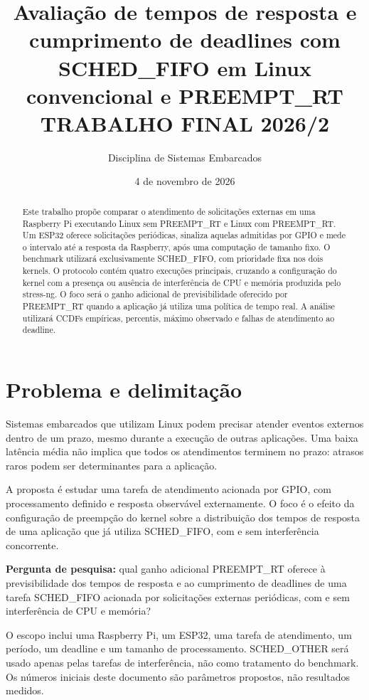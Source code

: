 \documentclass[11pt,a4paper]{article}
\title{Avaliação de tempos de resposta e cumprimento de deadlines com SCHED\_FIFO em Linux convencional e PREEMPT\_RT\\[0.4em]\large TRABALHO FINAL 2026/2}
\author{Disciplina de Sistemas Embarcados}
\date{4 de novembro de 2026}
\begin{document}
\maketitle

\begin{abstract}
Este trabalho propõe comparar o atendimento de solicitações externas em uma Raspberry Pi executando Linux sem PREEMPT\_RT e Linux com PREEMPT\_RT. Um ESP32 oferece solicitações periódicas, sinaliza aquelas admitidas por GPIO e mede o intervalo até a resposta da Raspberry, após uma computação de tamanho fixo. O benchmark utilizará exclusivamente SCHED\_FIFO, com prioridade fixa nos dois kernels. O protocolo contém quatro execuções principais, cruzando a configuração do kernel com a presença ou ausência de interferência de CPU e memória produzida pelo stress-ng. O foco será o ganho adicional de previsibilidade oferecido por PREEMPT\_RT quando a aplicação já utiliza uma política de tempo real. A análise utilizará CCDFs empíricas, percentis, máximo observado e falhas de atendimento ao deadline. %
\end{abstract}


\section{Problema e delimitação}

Sistemas embarcados que utilizam Linux podem precisar atender eventos externos dentro de um prazo, mesmo durante a execução de outras aplicações. Uma baixa latência média não implica que todos os atendimentos terminem no prazo: atrasos raros podem ser determinantes para a aplicação.

A proposta é estudar uma tarefa de atendimento acionada por GPIO, com processamento definido e resposta observável externamente. O foco é o efeito da configuração de preempção do kernel sobre a distribuição dos tempos de resposta de uma aplicação que já utiliza SCHED\_FIFO, com e sem interferência concorrente.

\textbf{Pergunta de pesquisa:} qual ganho adicional PREEMPT\_RT oferece à previsibilidade dos tempos de resposta e ao cumprimento de deadlines de uma tarefa SCHED\_FIFO acionada por solicitações externas periódicas, com e sem interferência de CPU e memória?

O escopo inclui uma Raspberry Pi, um ESP32, uma tarefa de atendimento, um período, um deadline e um tamanho de processamento. %
SCHED\_OTHER será usado apenas pelas tarefas de interferência, não como tratamento do benchmark. Os números iniciais deste documento são parâmetros propostos, não resultados medidos.
\end{document}
